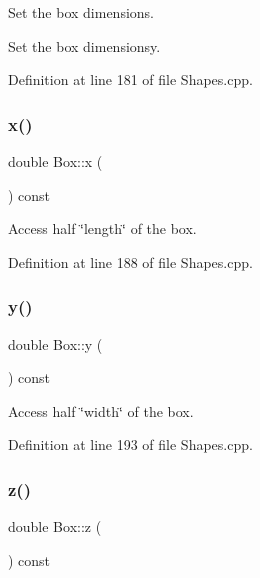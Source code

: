 Set the box dimensions. 

Set the box dimensionsy. 

Definition at line 181 of file Shapes.\+cpp.

\hypertarget{class_d_d4hep_1_1_geometry_1_1_box_a2310c0fb4f075b495ea5698dc59f2f69}{}\label{class_d_d4hep_1_1_geometry_1_1_box_a2310c0fb4f075b495ea5698dc59f2f69} 
\subsubsection{\texorpdfstring{x()}{x()}}
{\footnotesize\ttfamily double Box\+::x (\begin{DoxyParamCaption}{ }\end{DoxyParamCaption}) const}



Access half \char`\"{}length\char`\"{} of the box. 



Definition at line 188 of file Shapes.\+cpp.

\hypertarget{class_d_d4hep_1_1_geometry_1_1_box_ac0d32d681fbbbe93c01d4bc349d79894}{}\label{class_d_d4hep_1_1_geometry_1_1_box_ac0d32d681fbbbe93c01d4bc349d79894} 
\subsubsection{\texorpdfstring{y()}{y()}}
{\footnotesize\ttfamily double Box\+::y (\begin{DoxyParamCaption}{ }\end{DoxyParamCaption}) const}



Access half \char`\"{}width\char`\"{} of the box. 



Definition at line 193 of file Shapes.\+cpp.

\hypertarget{class_d_d4hep_1_1_geometry_1_1_box_acbe9b177de87314106387e7781bf7c32}{}\label{class_d_d4hep_1_1_geometry_1_1_box_acbe9b177de87314106387e7781bf7c32} 
\subsubsection{\texorpdfstring{z()}{z()}}
{\footnotesize\ttfamily double Box\+::z (\begin{DoxyParamCaption}{ }\end{DoxyParamCaption}) const}



